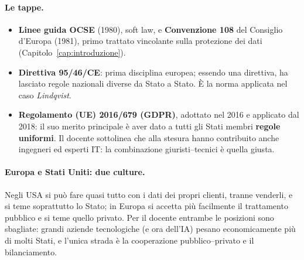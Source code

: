 \paragraph{Le tappe.}
\begin{itemize}
  \item \textbf{Linee guida OCSE} (1980), soft law, e \textbf{Convenzione 108} del Consiglio d'Europa
    (1981), primo trattato vincolante sulla protezione dei dati (Capitolo~\ref{cap:introduzione}).
  \item \textbf{Direttiva 95/46/CE}: prima disciplina europea; essendo una direttiva, ha lasciato
    regole nazionali diverse da Stato a Stato. È la norma applicata nel caso \emph{Lindqvist}.
  \item \textbf{Regolamento (UE) 2016/679 (GDPR)}, adottato nel 2016 e applicato dal 2018: il suo
    merito principale è aver dato a tutti gli Stati membri \textbf{regole uniformi}. Il docente sottolinea
    che alla stesura hanno contribuito anche ingegneri ed esperti IT: la combinazione giuristi--tecnici è
    quella giusta.
\end{itemize}

\paragraph{Europa e Stati Uniti: due culture.} Negli USA si può fare quasi tutto con i dati dei propri
clienti, tranne venderli, e si teme soprattutto lo Stato; in Europa si accetta più facilmente il
trattamento pubblico e si teme quello privato. Per il docente entrambe le posizioni sono sbagliate:
grandi aziende tecnologiche (e ora dell'IA) pesano economicamente più di molti Stati, e l'unica strada è
la cooperazione pubblico--privato e il bilanciamento.

